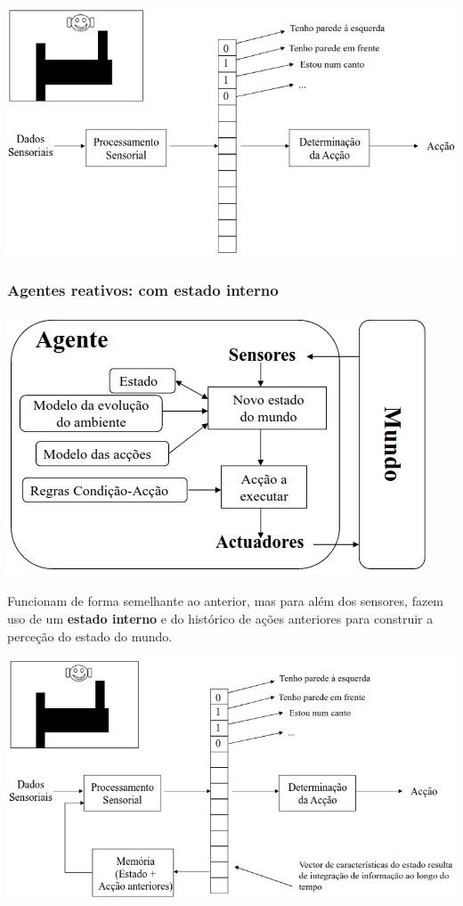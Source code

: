 \documentclass{article}
\begin{document}
\begin{center}
  \includegraphics[scale=0.35]{10}
\end{center}

\pagebreak

\subsubsection{Agentes reativos: com estado interno}

\begin{center}
  \includegraphics[scale=0.4]{11}
\end{center}

Funcionam de forma semelhante ao
anterior, mas para além dos sensores, fazem uso de um \textbf{estado interno} e do histórico de ações
anteriores para construir a perceção do estado do mundo.

\begin{center}
  \includegraphics[scale=0.35]{12}
\end{center}
\end{document}
